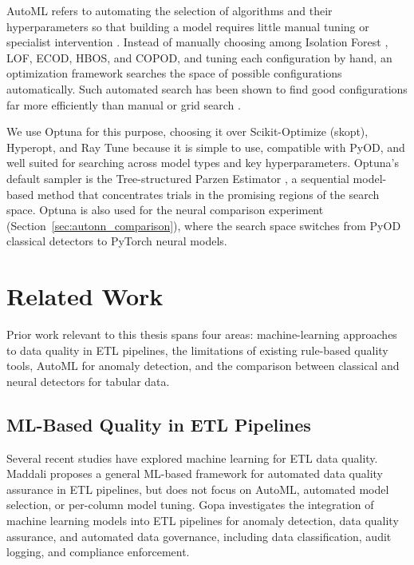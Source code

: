 \documentclass[12pt]{article}
\begin{document}
AutoML refers to automating the selection of algorithms and their hyperparameters so that building a model requires little manual tuning or specialist intervention \cite{he2021automl}. Instead of manually choosing among Isolation Forest \cite{liu2008isolationforest}, LOF, ECOD, HBOS, and COPOD, and tuning each configuration by hand, an optimization framework searches the space of possible configurations automatically. Such automated search has been shown to find good configurations far more efficiently than manual or grid search \cite{bergstra2012random}.

We use Optuna \cite{akiba2019optuna} for this purpose, choosing it over Scikit-Optimize (skopt), Hyperopt, and Ray Tune because it is simple to use, compatible with PyOD, and well suited for searching across model types and key hyperparameters. Optuna's default sampler is the Tree-structured Parzen Estimator \cite{bergstra2011hyperparameter}, a sequential model-based method that concentrates trials in the promising regions of the search space. Optuna is also used for the neural comparison experiment (Section~\ref{sec:autonn_comparison}), where the search space switches from PyOD classical detectors to PyTorch neural models.


\section{Related Work}\label{sec:relatedwork}

Prior work relevant to this thesis spans four areas: machine-learning approaches to data quality in ETL pipelines, the limitations of existing rule-based quality tools, AutoML for anomaly detection, and the comparison between classical and neural detectors for tabular data.

\subsection{ML-Based Quality in ETL Pipelines}

Several recent studies have explored machine learning for ETL data quality. Maddali \cite{Maddali2021AutomatingDQ} proposes a general ML-based framework for automated data quality assurance in ETL pipelines, but does not focus on AutoML, automated model selection, or per-column model tuning. Gopa \cite{gopa2025aiaugmentedetl} investigates the integration of machine learning models into ETL pipelines for anomaly detection, data quality assurance, and automated data governance, including data classification, audit logging, and compliance enforcement.
\end{document}
